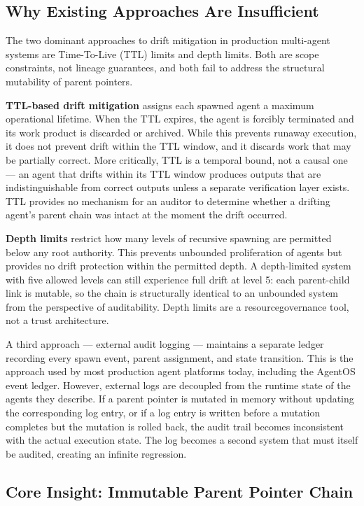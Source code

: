 \subsection{Why Existing Approaches Are Insufficient}

The two dominant approaches to drift mitigation in production multi-agent systems are Time-To-Live (TTL) limits and depth limits. Both are scope constraints, not lineage guarantees, and both fail to address the structural mutability of parent pointers.

\textbf{TTL-based drift mitigation} assigns each spawned agent a maximum operational lifetime. When the TTL expires, the agent is forcibly terminated and its work product is discarded or archived. While this prevents runaway execution, it does not prevent drift within the TTL window, and it discards work that may be partially correct. More critically, TTL is a temporal bound, not a causal one — an agent that drifts within its TTL window produces outputs that are indistinguishable from correct outputs unless a separate verification layer exists. TTL provides no mechanism for an auditor to determine whether a drifting agent's parent chain was intact at the moment the drift occurred.

\textbf{Depth limits} restrict how many levels of recursive spawning are permitted below any root authority. This prevents unbounded proliferation of agents but provides no drift protection within the permitted depth. A depth-limited system with five allowed levels can still experience full drift at level 5: each parent-child link is mutable, so the chain is structurally identical to an unbounded system from the perspective of auditability. Depth limits are a resourcegovernance tool, not a trust architecture.

A third approach — external audit logging — maintains a separate ledger recording every spawn event, parent assignment, and state transition. This is the approach used by most production agent platforms today, including the AgentOS event ledger. However, external logs are decoupled from the runtime state of the agents they describe. If a parent pointer is mutated in memory without updating the corresponding log entry, or if a log entry is written before a mutation completes but the mutation is rolled back, the audit trail becomes inconsistent with the actual execution state. The log becomes a second system that must itself be audited, creating an infinite regression.

\subsection{Core Insight: Immutable Parent Pointer Chain}

